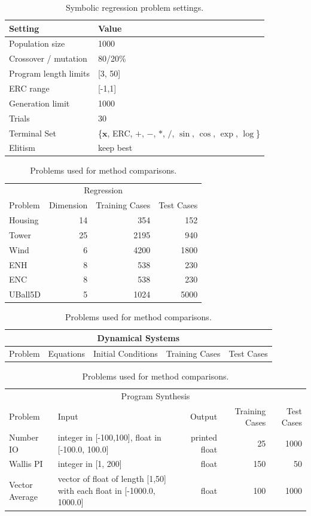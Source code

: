 \documentclass[preprint]{article}
\begin{document}
\begin{table}
\scriptsize
\caption{Symbolic regression problem settings.}\label{tbl:symreg_settings}
\begin{tabularx}{\columnwidth}{X R{0.57\columnwidth}} \toprule
Setting& Value \\ \midrule
Population size & 1000 \\
Crossover / mutation & 80/20\% \\
Program length limits & [3, 50] \\ 
ERC range & [-1,1] \\
Generation limit & 1000 \\
Trials & 30 \\
Terminal Set & \{$\mathbf{x}$, ERC, $+$, $-$, $*$, $/$, $\sin$, $\cos$, $\exp$, $\log$\}\\
Elitism & keep best \\
\end{tabularx}
\end{table}
\begin{table}
\scriptsize
\caption{Problems used for method comparisons.}\label{tbl:datasets}
\begin{tabularx}{\columnwidth}{X r r r} \toprule
\multicolumn{4}{c}{Regression}\\ 
Problem & Dimension & Training Cases & Test Cases \\ \midrule
Housing & 14 & 354 & 152 \\
Tower & 25 & 2195 &  940 \\
Wind & 6 & 4200 & 1800 \\
ENH & 8 & 538 & 230 \\
ENC & 8 & 538 & 230 \\
UBall5D & 5 & 1024 & 5000 \\ \midrule
\end{tabularx}
\begin{tabularx}{\columnwidth}{X X r r r} 
\multicolumn{5}{c}{Dynamical Systems}\\ \midrule
Problem & Equations & Initial Conditions	& Training Cases & Test Cases \\ \midrule
\end{tabularx}
\begin{tabularx}{\columnwidth}{X X r r r} 
\multicolumn{5}{c}{Program Synthesis}\\ 
Problem	& Input & Output	& Training Cases & Test Cases \\\midrule
Number IO & integer in [-100,100], float in [-100.0, 100.0]	&	printed float & 25 & 1000 \\
Wallis PI & integer in [1, 200] & float &	150 & 50 \\
Vector Average & vector of float of length [1,50] with each float in [-1000.0, 1000.0]	& float &	100	&	1000 \\ 
\bottomrule
\end{tabularx}

\end{table} 
\end{document}
